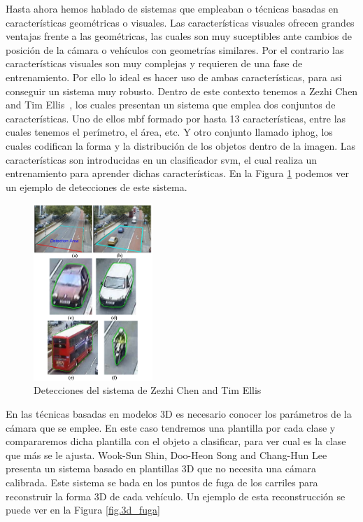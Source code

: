 Hasta ahora hemos hablado de sistemas que empleaban o técnicas basadas en características geométricas o visuales. Las características visuales ofrecen grandes ventajas frente a las geométricas, las cuales son muy suceptibles ante cambios de posición de la cámara o vehículos con geometrías similares. Por el contrario las características visuales son muy complejas y requieren de una fase de entrenamiento. Por ello lo ideal es hacer uso de ambas características, para asi conseguir un sistema muy robusto. Dentro de este contexto tenemos a Zezhi Chen and Tim Ellis~\cite{multi_shape_descriptor}, los cuales presentan un sistema que emplea dos conjuntos de características. Uno de ellos \acrfull{mbf} formado por hasta 13 características, entre las cuales tenemos el perímetro, el área, etc. Y otro conjunto llamado \acrfull{iphog}, los cuales codifican la forma y la distribución de los objetos dentro de la imagen. Las características son introducidas en un clasificador \acrshort{svm}, el cual realiza un entrenamiento para aprender dichas características. En la Figura \ref{fig.multi_shape_descriptor} podemos ver un ejemplo de detecciones de este sistema.

\begin{figure}[H]
  \begin{center}
    \includegraphics[width=0.4\textwidth]{figures/Estado_arte/svm_iphog.png}
		\caption{Detecciones del sistema de  Zezhi Chen and Tim Ellis~\cite{multi_shape_descriptor}}
		\label{fig.multi_shape_descriptor}
		\end{center}
\end{figure}

En las técnicas basadas en modelos 3D es necesario conocer los parámetros de la cámara que se emplee. En este caso tendremos una plantilla por cada clase y compararemos dicha plantilla con el objeto a clasificar, para ver cual es la clase que más se le ajusta.
Wook-Sun Shin, Doo-Heon Song and Chang-Hun Lee~\cite{vehicle_classification_by_road} presenta  un  sistema  basado  en  plantillas  3D  que  no necesita una cámara calibrada. Este sistema se bada en los puntos de fuga de los carriles para reconstruir la forma 3D de cada vehículo. Un ejemplo de esta reconstrucción se puede ver en la Figura \ref{fig.3d_fuga}

